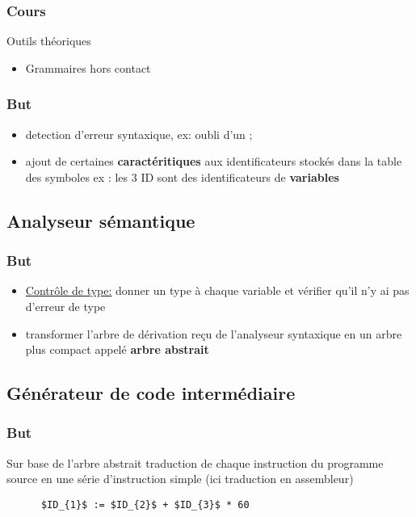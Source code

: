 \documentclass[a4paper,10pt]{report}
\begin{document}
  \subsubsection{Cours}
  Outils théoriques
  \begin{itemize}
   \item Grammaires hors contact
  \end{itemize}
    \subsubsection{But}
  \begin{itemize}
   \item detection d'erreur syntaxique, ex: oubli d'un ;
   \item ajout de certaines \textbf{caractéritiques} aux identificateurs stockés dans la table des symboles
   ex : les 3 ID sont des identificateurs de \textbf{variables}
  \end{itemize}
  
  \subsection{Analyseur sémantique}
  \subsubsection{But}
    \begin{itemize}
     \item \underline{Contrôle de type:} donner un type à chaque variable et vérifier qu'il n'y ai pas d'erreur de type
     \item transformer l'arbre de dérivation reçu de l'analyseur syntaxique en un arbre plus compact appelé \textbf{arbre abstrait}
    \end{itemize}
    
    \subsection{Générateur de code intermédiaire}
      \subsubsection{But}
      Sur base de l'arbre abstrait traduction de chaque instruction du programme source en une série d'instruction simple (ici traduction en assembleur)
      
      \begin{lstlisting}
      $ID_{1}$ := $ID_{2}$ + $ID_{3}$ * 60  
      \end{lstlisting}
      
\end{document}
